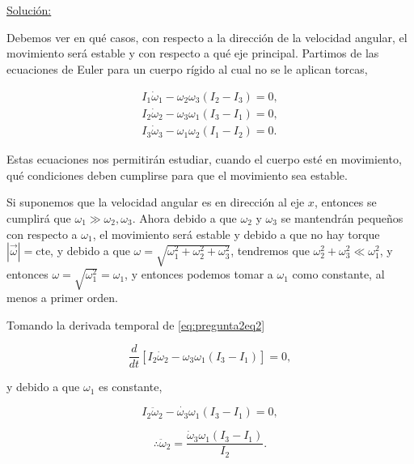 \documentclass[a4paper,10pt]{article}
\numberwithin{equation}{section}
\begin{document}
\vspace{.3cm}

\underline{Solución:} \vspace{.3cm} 

Debemos ver en qué casos, con respecto a la dirección de la velocidad angular, el 
movimiento será estable y con respecto a qué eje principal. Partimos de las ecuaciones 
de Euler para un cuerpo rígido al cual no se le aplican torcas,

\begin{align}
 \label{eq:pregunta2eq1}
 I_1\dot{\omega}_1 - \omega_2\omega_3(I_2 - I_3) = 0, \\
 \label{eq:pregunta2eq2}
 I_2\dot{\omega}_2 - \omega_3\omega_1(I_3 - I_1) = 0, \\
 \label{eq:pregunta2eq3}
 I_3\dot{\omega}_3 - \omega_1\omega_2(I_1 - I_2) = 0.
\end{align}

Estas ecuaciones nos permitirán estudiar, cuando el cuerpo esté en movimiento, qué 
condiciones deben cumplirse para que el movimiento sea estable.

\vspace{.3cm}

Si suponemos que la velocidad angular es en dirección al eje $x$, entonces se 
cumplirá que $\omega_1 \gg \omega_2,\omega_3$. Ahora debido a que $\omega_2$ y 
$\omega_3$ se mantendrán pequeños con respecto a $\omega_1$, el movimiento será 
estable y debido a que no hay torque $|\overrightarrow{\omega}| = \text{cte}$, y 
debido a que $\omega = \sqrt{\omega_1^2 + \omega_2^2 + \omega_3^2}$, tendremos que 
$\omega_2^2 + \omega_3^2 \ll \omega_1^2$, y entonces $\omega = \sqrt{\omega_1^2} = 
\omega_1$, y entonces podemos tomar a $\omega_1$ como constante, al menos 
a primer orden.

\vspace{.3cm}

Tomando la derivada temporal de \eqref{eq:pregunta2eq2} 

\begin{equation}
 \frac{d}{dt}\left[I_2\dot{\omega}_2 - \omega_3\omega_1(I_3 - I_1) \right] = 0,
\end{equation}

y debido a que $\omega_1$ es constante, 

\begin{equation}
 I_2\ddot{\omega}_2 - \dot{\omega_3}\omega_1(I_3 - I_1) = 0,
\end{equation}

\begin{equation}
 \therefore \ddot{\omega}_2 = \frac{\dot{\omega}_3\omega_1(I_3-I_1)}{I_2}.
  \label{eq:pregunta2eq4}
\end{equation}
\end{document}
